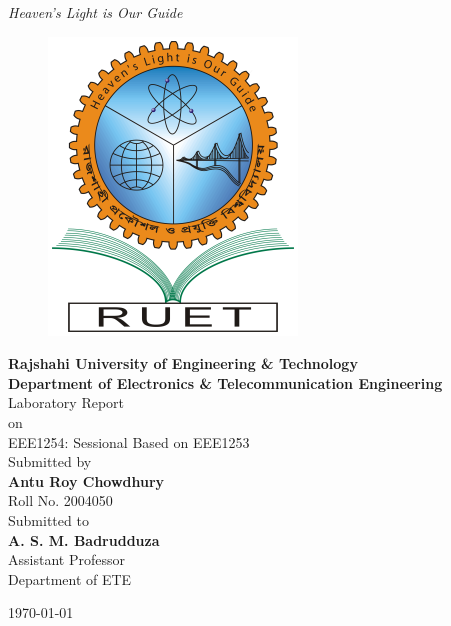 \thispagestyle{empty}
\begin{center}
\textit{Heaven's Light is Our Guide}
\\ [.5cm]
\begin{figure}[!htbp]
    \centering
    \includegraphics[scale=0.3]{Figures/logo_ruet.png}
    \label{fig:DTU logo}
\end{figure}
\Large \textbf{Rajshahi University of Engineering \& Technology}
\\
\large \textbf{Department of Electronics \& Telecommunication Engineering}
\\ [3pc]


Laboratory Report
\\ 
on
\\
EEE1254: Sessional Based on EEE1253
\\ [2pc]


Submitted by
\\
\textbf{Antu Roy Chowdhury}
\\
Roll No. 2004050
\\[2pc]


Submitted to
\\
\textbf{A. S. M. Badrudduza}
\\
Assistant Professor
\\
Department of ETE


\vfill
\today 
\end{center}


